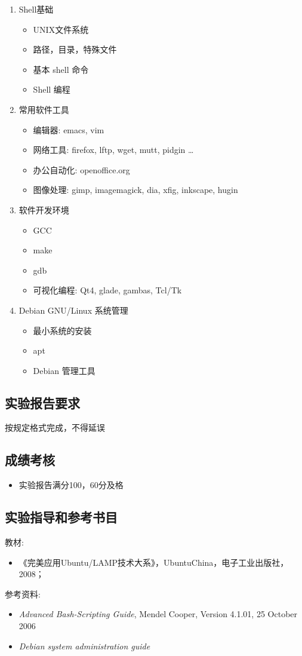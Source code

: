 \documentclass[12pt,a4paper]{article}
\begin{document}
\begin{enumerate}
\item Shell基础
  \begin{itemize}
  \item UNIX文件系统
  \item 路径，目录，特殊文件
  \item 基本 shell 命令
  \item Shell 编程
  \end{itemize}
\item 常用软件工具
  \begin{itemize}
  \item 编辑器: emacs, vim
  \item 网络工具: firefox, lftp, wget, mutt, pidgin \ldots{}
  \item 办公自动化: openoffice.org
  \item 图像处理: gimp, imagemagick, dia, xfig, inkscape, hugin
  \end{itemize}
\item 软件开发环境
  \begin{itemize}
  \item GCC
  \item make
  \item gdb
  \item 可视化编程: Qt4, glade, gambas, Tcl/Tk
  \end{itemize}
\item Debian GNU/Linux 系统管理
  \begin{itemize}
  \item 最小系统的安装
  \item apt
  \item Debian 管理工具
  \end{itemize}
\end{enumerate}
\subsection{实验报告要求}
按规定格式完成，不得延误

\subsection{成绩考核}

\begin{itemize}
\item 实验报告满分100，60分及格
\end{itemize}

\subsection{实验指导和参考书目}
教材:
\begin{itemize}
\item 《完美应用Ubuntu/LAMP技术大系》，UbuntuChina，电子工业出版社，2008；
\end{itemize}
参考资料:
\begin{itemize}
\item \emph{Advanced Bash-Scripting Guide}, Mendel Cooper, Version 4.1.01, 25 October 2006
\item \emph{Debian system administration guide}
\end{itemize}
\end{document}
